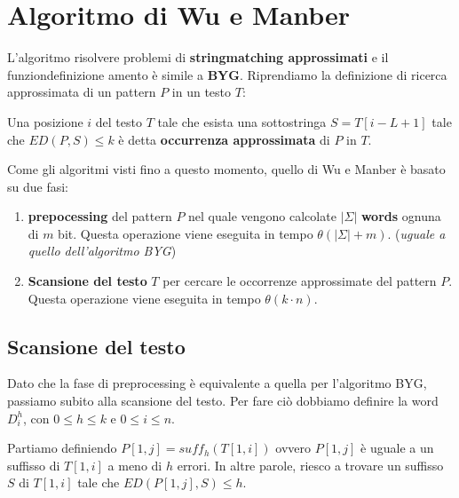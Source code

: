 \section{Algoritmo di Wu e Manber}
L'algoritmo risolvere problemi di \textbf{stringmatching approssimati} e il funziondefinizione amento
è simile a \textbf{BYG}.
Riprendiamo la definizione di ricerca approssimata di un pattern $P$ in un testo $T$:
\begin{definizione}
    Una posizione $i$ del testo $T$ tale che esista una sottostringa $S =T[i - L + 1]$
    tale che $ED(P, S) \leq k$ è detta \textbf{occurrenza approssimata} di $P$ in $T$.
\end{definizione}

Come gli algoritmi visti fino a questo momento, quello di Wu e Manber è basato su due fasi:
\begin{enumerate}
    \item \textbf{prepocessing} del pattern $P$ nel quale vengono calcolate $|\Sigma|$
          \textbf{words} ognuna di $m$ bit. Questa operazione viene eseguita in tempo
          $\theta(|\Sigma| + m)$. (\textit{uguale a quello dell'algoritmo BYG})
    \item \textbf{Scansione del testo} $T$ per cercare le occorrenze approssimate del pattern $P$.
          Questa operazione viene eseguita in tempo $\theta(k \cdot n)$.
\end{enumerate}
\subsection{Scansione del testo}
Dato che la fase di preprocessing è equivalente a quella per l'algoritmo BYG,
passiamo subito alla scansione del testo. Per fare ciò dobbiamo definire la word
$D_i^h$, con $0 \leq h \leq k$ e $0 \leq i \leq n$.

Partiamo definiendo $P[1, j] = suff_h(T[1, i])$ ovvero $P[1, j]$ è uguale a un
suffisso di $T[1, i]$ a meno di $h$ errori. In altre parole, riesco a trovare un
suffisso $S$ di $T[1, i]$ tale che $ED(P[1, j], S) \leq h$.

